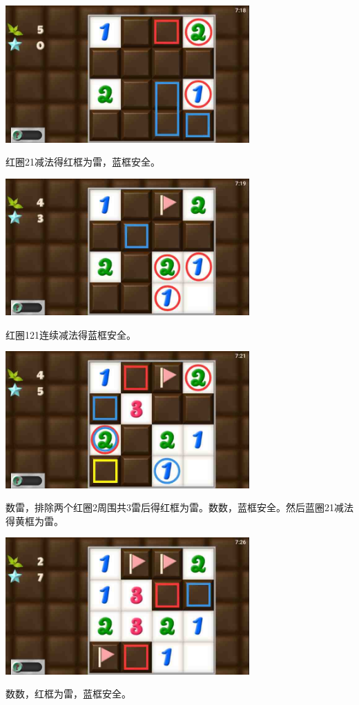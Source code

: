 \subsection{} %
\begin{center}
    \includegraphics[width=0.7\textwidth]{puzzlelow/41-1.jpg}
\end{center}
红圈21减法得红框为雷，蓝框安全。
\begin{center}
    \includegraphics[width=0.7\textwidth]{puzzlelow/41-2.jpg}
\end{center}
红圈121连续减法得蓝框安全。
\begin{center}
    \includegraphics[width=0.7\textwidth]{puzzlelow/41-3.jpg}
\end{center}
数雷，排除两个红圈2周围共3雷后得红框为雷。数数，蓝框安全。然后蓝圈21减法得黄框为雷。
\begin{center}
    \includegraphics[width=0.7\textwidth]{puzzlelow/41-4.jpg}
\end{center}
数数，红框为雷，蓝框安全。

